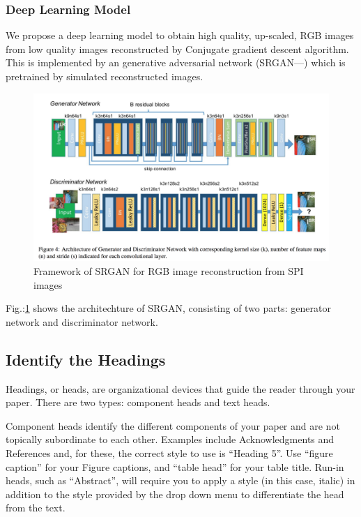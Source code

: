 \documentclass[conference]{IEEEtran}
\begin{document}
\subsubsection{Deep Learning Model}
\par We propose a deep learning model to obtain high quality, up-scaled, RGB images from low quality images reconstructed by Conjugate gradient descent algorithm. This is implemented by an generative adversarial network (SRGAN---) which is pretrained by simulated reconstructed images. 

\begin{figure}[ht]
\centering
\includegraphics[width=1\linewidth]{figures/srgan_architecture.png} %
\caption{Framework of SRGAN for RGB image reconstruction from SPI images}
\label{fig:deep_learning_model_sample_image}
\end{figure}
\par
Fig.:\ref{fig:deep_learning_model_sample_image} shows the architechture of SRGAN, consisting of two parts: generator network and discriminator network.
\medskip

\subsection{Identify the Headings}
Headings, or heads, are organizational devices that guide the reader through 
your paper. There are two types: component heads and text heads.

Component heads identify the different components of your paper and are not 
topically subordinate to each other. Examples include Acknowledgments and 
References and, for these, the correct style to use is ``Heading 5''. Use 
``figure caption'' for your Figure captions, and ``table head'' for your 
table title. Run-in heads, such as ``Abstract'', will require you to apply a 
style (in this case, italic) in addition to the style provided by the drop 
down menu to differentiate the head from the text.
\end{document}
